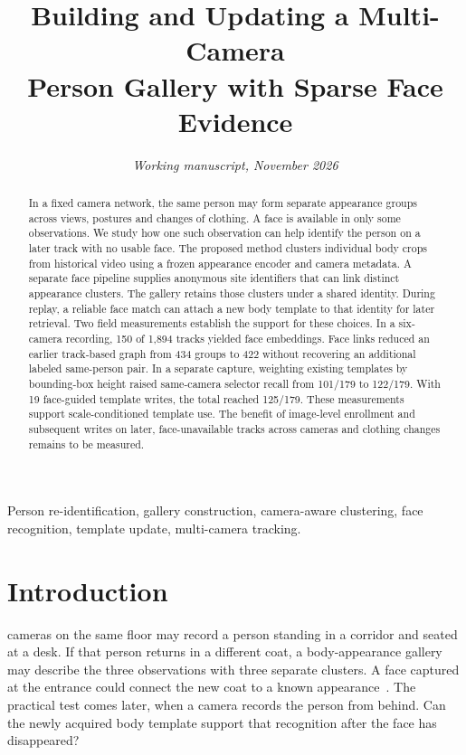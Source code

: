 \documentclass[journal,letterpaper]{IEEEtran}
\begin{document}
\title{Building and Updating a Multi-Camera\\ Person Gallery with Sparse Face Evidence}
\author{\textit{Working manuscript, November 2026}}
\maketitle

\begin{abstract}
In a fixed camera network, the same person may form separate appearance groups across views, postures and changes of clothing. A face is available in only some observations. We study how one such observation can help identify the person on a later track with no usable face. The proposed method clusters individual body crops from historical video using a frozen appearance encoder and camera metadata. A separate face pipeline supplies anonymous site identifiers that can link distinct appearance clusters. The gallery retains those clusters under a shared identity. During replay, a reliable face match can attach a new body template to that identity for later retrieval. Two field measurements establish the support for these choices. In a six-camera recording, 150 of 1,894 tracks yielded face embeddings. Face links reduced an earlier track-based graph from 434 groups to 422 without recovering an additional labeled same-person pair. In a separate capture, weighting existing templates by bounding-box height raised same-camera selector recall from 101/179 to 122/179. With 19 face-guided template writes, the total reached 125/179. These measurements support scale-conditioned template use. The benefit of image-level enrollment and subsequent writes on later, face-unavailable tracks across cameras and clothing changes remains to be measured.
\end{abstract}
\begin{IEEEkeywords}
Person re-identification, gallery construction, camera-aware clustering, face recognition, template update, multi-camera tracking.
\end{IEEEkeywords}

\section{Introduction}\label{sec:introduction}
 cameras on the same floor may record a person standing in a corridor and seated at a desk. If that person returns in a different coat, a body-appearance gallery may describe the three observations with three separate clusters. A face captured at the entrance could connect the new coat to a known appearance~\cite{cocas,geff}. The practical test comes later, when a camera records the person from behind. Can the newly acquired body template support that recognition after the face has disappeared?
\end{document}
